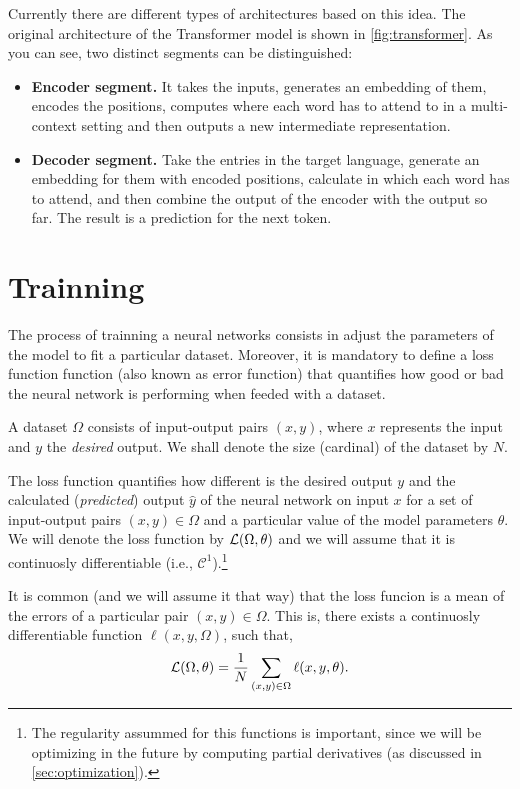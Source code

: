 Currently there are different types of architectures based on this idea. The
original architecture of the Transformer model is shown in
\vref{fig:transformer}. As you can see, two distinct segments can be
distinguished:
\begin{itemize}
  \item \textbf{Encoder segment.} It takes the inputs, generates an embedding
  of them, encodes the positions, computes where each word has to attend to in
  a multi-context setting and then outputs a new intermediate representation.
  \item \textbf{Decoder segment.} Take the entries in the target language,
  generate an embedding for them with encoded positions, calculate in which
  each word has to attend, and then combine the output of the encoder with the
  output so far. The result is a prediction for the next token.
\end{itemize}



\section{Trainning}

The process of trainning a neural networks consists in adjust the parameters of
the model to fit a particular dataset. Moreover, it is mandatory to define a
loss function function (also known as error function) that quantifies how good
or bad the neural network is performing when feeded with a dataset.

A dataset \(\Omega\) consists of input-output pairs \((x, y)\), where \(x\)
represents the input and \(y\) the \emph{desired} output. We shall denote the
size (cardinal) of the dataset by \(N\).

The loss function quantifies how different is the desired output \(y\) and the
calculated (\emph{predicted}) output \(\hat{y}\) of the neural network on input
\(x\) for a set of input-output pairs \((x , y) \in \Omega\) and a particular
value of the model parameters \(\theta\). We will denote the loss function by
\(\mathcal{L} (\Omega, \theta)\) and we will assume that it is continuosly
differentiable (i.e., \(\mathcal{C}^1\)).\footnote{The regularity assummed for
  this functions is important, since we will be optimizing in the future by
  computing partial derivatives (as discussed in \vref{sec:optimization}).}

It is common (and we will assume it that way) that the loss funcion is a mean
of the errors of a particular pair \((x, y) \in \Omega\). This is, there exists
a continuosly differentiable function \(\ell (x, y, \Omega)\), such that,
\begin{equation} \label{eq:loss}
  \mathcal{L}(\Omega, \theta) =
  \frac{1}{N} \sum_{(x, y) \in \Omega} \ell (x, y, \theta).
\end{equation}

